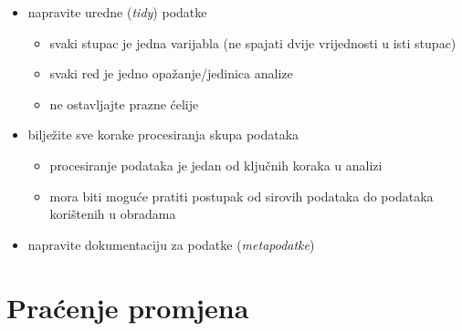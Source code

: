 \documentclass[aspectratio=169]{beamer}
\begin{document}
\begin{frame}
    \begin{itemize}
        \setlength{\itemsep}{2em}

        \item napravite uredne (\textit{tidy}) podatke

        \begin{itemize}
            \item svaki stupac je jedna varijabla (ne spajati dvije vrijednosti
                u isti stupac)

            \item svaki red je jedno opažanje/jedinica analize

            \item ne ostavljajte prazne ćelije
        \end{itemize}

        \pause

        \item bilježite sve korake procesiranja skupa podataka

        \pause

        \begin{itemize}
            \item procesiranje podataka je jedan od ključnih koraka u analizi

            \pause

            \item mora biti moguće pratiti postupak od sirovih podataka do
                podataka korištenih u obradama
        \end{itemize}

        \pause

        \item napravite dokumentaciju za podatke (\textit{metapodatke})
    \end{itemize}
\end{frame}

\section{Praćenje promjena}
\end{document}
